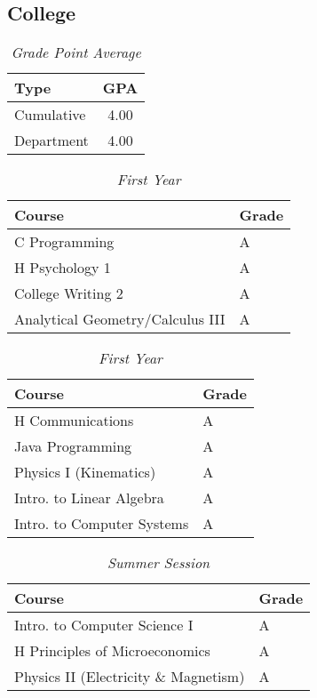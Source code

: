 \documentclass[12pt]{article}
\renewcommand{\it}[1]{\textit{{#1}}}
\begin{document}
\subsection{College}
\begin{table}[H]
    \centering
    \caption*{\it{Grade Point Average}}
    \vspace{-0.8em}
    \begin{tabular}{l|c}
        Type       & GPA  \\
        \hline
        Cumulative & 4.00 \\
        Department & 4.00 \\
    \end{tabular}
    \vspace{-1em}
\end{table}
\begin{table}[H]
    \centering
    \caption*{\it{First Year}}
    \vspace{-0.8em}
    \begin{tabular}{l|l}
        Course                                 & Grade \\
        \hline
        C Programming                          & A \\
        H Psychology 1                         & A \\
        College Writing 2                      & A \\
        Analytical Geometry/Calculus III       & A \\
    \end{tabular}
    \hfill
    \begin{tabular}{l|l}
        Course                                 & Grade \\
        \hline
        H Communications                       & A \\
        Java Programming                       & A \\
        Physics I (Kinematics)                 & A \\
        Intro. to Linear Algebra               & A \\
        Intro. to Computer Systems             & A \\
    \end{tabular}
    \vspace{-1em}
\end{table}

\begin{table}[H]
    \centering
    \vspace{-0.8em}
    \caption*{\it{Summer Session}}
    \begin{tabular}{l|l}
        Course                                 & Grade \\
        \hline
        Intro. to Computer Science I           & A \\
        H Principles of Microeconomics         & A \\
        Physics II (Electricity \& Magnetism)  & A \\
    \end{tabular}
    \vspace{-1em}
\end{table}
\end{document}
